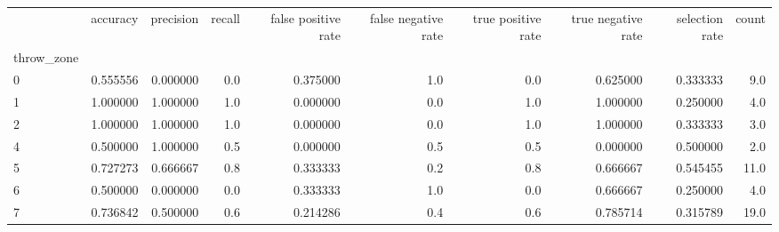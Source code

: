 \begin{tabular}{lrrrrrrrrr}
\toprule
{} &  accuracy &  precision &  recall &  false positive rate &  false negative rate &  true positive rate &  true negative rate &  selection rate &  count \\
throw\_zone &           &            &         &                      &                      &                     &                     &                 &        \\
\midrule
0          &  0.555556 &   0.000000 &     0.0 &             0.375000 &                  1.0 &                 0.0 &            0.625000 &        0.333333 &    9.0 \\
1          &  1.000000 &   1.000000 &     1.0 &             0.000000 &                  0.0 &                 1.0 &            1.000000 &        0.250000 &    4.0 \\
2          &  1.000000 &   1.000000 &     1.0 &             0.000000 &                  0.0 &                 1.0 &            1.000000 &        0.333333 &    3.0 \\
4          &  0.500000 &   1.000000 &     0.5 &             0.000000 &                  0.5 &                 0.5 &            0.000000 &        0.500000 &    2.0 \\
5          &  0.727273 &   0.666667 &     0.8 &             0.333333 &                  0.2 &                 0.8 &            0.666667 &        0.545455 &   11.0 \\
6          &  0.500000 &   0.000000 &     0.0 &             0.333333 &                  1.0 &                 0.0 &            0.666667 &        0.250000 &    4.0 \\
7          &  0.736842 &   0.500000 &     0.6 &             0.214286 &                  0.4 &                 0.6 &            0.785714 &        0.315789 &   19.0 \\
\bottomrule
\end{tabular}
